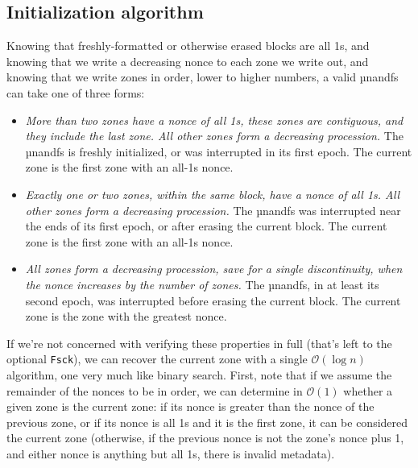 \documentclass[letterpaper,10pt]{article}
\newenvironment{denseitemize}{
  \begin{itemize}
      \setlength{\itemsep}{0pt}
}{
  \end{itemize}
}
\begin{document}
\subsection{Initialization algorithm} \label{callzones}
Knowing that freshly-formatted or otherwise erased blocks are all 1s, and
knowing that we write a decreasing nonce to each zone we write out, and knowing
that we write zones in order, lower to higher numbers, a valid µnandfs can take
one of three forms:
\begin{denseitemize}
\item \textit{More than two zones have a nonce of all 1s, these zones are
    contiguous, and they include the last zone. All other zones form a
    decreasing procession.} The µnandfs is freshly initialized, or was interrupted
    in its first epoch. The current zone is the first zone with an
    all-1s nonce.
\item \textit{Exactly one or two zones, within the same block, have a nonce of
    all 1s. All other zones form a decreasing procession.} The µnandfs was
  interrupted near the ends of its first epoch, or after erasing the current
  block.  The current zone is the first zone with an all-1s nonce.
\item \textit{All zones form a decreasing procession, save for a single discontinuity,
    when the nonce increases by the number of zones.} The µnandfs, in at least
    its second epoch, was interrupted before erasing the current block.
    The current zone is the zone with the greatest nonce.
\end{denseitemize}
If we're not concerned with verifying these properties in full (that's left to
the optional \texttt{Fsck}), we can recover the current zone with a single
$\mathcal{O}(\log{}n)$ algorithm, one very much like binary search. First, note that if we
assume the remainder of the nonces to be in order, we can determine in $\mathcal{O}(1)$ 
whether a given zone is the current zone: if its nonce is greater than the
nonce of the previous zone, or if its nonce is all 1s and it is the first zone,
it can be considered the current zone (otherwise, if the previous nonce is not the
zone's nonce plus 1, and either nonce is anything but all 1s, there is
invalid metadata).
\end{document}
